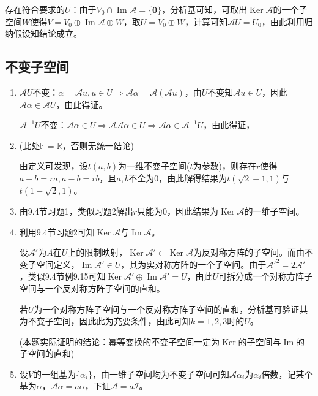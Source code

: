 \documentclass[a4paper,UTF8,fontset=windows]{ctexart}
\DeclareMathOperator{\im}{Im}
\DeclareMathOperator{\Ker}{Ker}
\begin{document}
\begin{enumerate}
存在符合要求的$U$：由于$V_0\cap\im\mathcal{A}=\{\mathbf{0}\}$，分析基可知，可取出$\Ker\mathcal{A}$的一个子空间$W$使得$V=V_0\oplus\im\mathcal{A}\oplus W$，取$U=V_0\oplus W$，计算可知$\mathcal{A}U=U_0$，由此利用归纳假设知结论成立。
\end{enumerate}

\subsection{不变子空间}
\begin{enumerate}
\item
$\mathcal{A}U$不变：$\alpha=\mathcal{A}u,u\in U\Rightarrow\mathcal{A}\alpha=\mathcal{A}(\mathcal{A}u)$，由$U$不变知$\mathcal{A}u\in U$，因此$\mathcal{A}\alpha\in\mathcal{A}U$，由此得证。

$\mathcal{A}^{-1}U$不变：$\mathcal{A}\alpha\in U\Rightarrow\mathcal{A}\mathcal{A}\alpha\in U\Rightarrow\mathcal{A}\alpha\in\mathcal{A}^{-1}U$，由此得证，

\item
(此处$\mathbb{F}=\mathbb{R}$，否则无统一结论)

由定义可发现，设$t(a,b)$为一维不变子空间($t$为参数)，则存在$r$使得$a+b=ra,a-b=rb$，且$a,b$不全为0，由此解得结果为$t(\sqrt2+1,1)$与$t(1-\sqrt2,1)$。

\item
由9.4节习题1，类似习题2解出$r$只能为0，因此结果为$\Ker\mathcal{A}$的一维子空间。

\item
利用9.4节习题2可知$\Ker\mathcal{A}$与$\im\mathcal{A}$。

设$\mathcal{A}'$为$A$在$U$上的限制映射，$\Ker\mathcal{A}'\subset\Ker\mathcal{A}$为反对称方阵的子空间。而由不变子空间定义，$\im\mathcal{A}'\in U$，其为实对称方阵的一个子空间。由于$\mathcal{A}'^2=2\mathcal{A}'$，类似9.4节例9.15可知$\Ker\mathcal{A}'\oplus\im\mathcal{A}'=U$，由此$U$可拆分成一个对称方阵子空间与一个反对称方阵子空间的直和。

若$U$为一个对称方阵子空间与一个反对称方阵子空间的直和，分析基可验证其为不变子空间，因此此为充要条件，由此可知$k=1,2,3$时的$U$。

(本题实际证明的结论：幂等变换的不变子空间一定为$\Ker$的子空间与$\im$的子空间的直和)

\item
设$V$的一组基为$\{\alpha_i\}$，由一维子空间均为不变子空间可知$\mathcal{A}\alpha_i$为$\alpha_i$倍数，记某个基为$\alpha$，$\mathcal{A}\alpha=a\alpha$，下证$\mathcal{A}=a\mathcal{I}$。


\end{enumerate}
\end{document}
